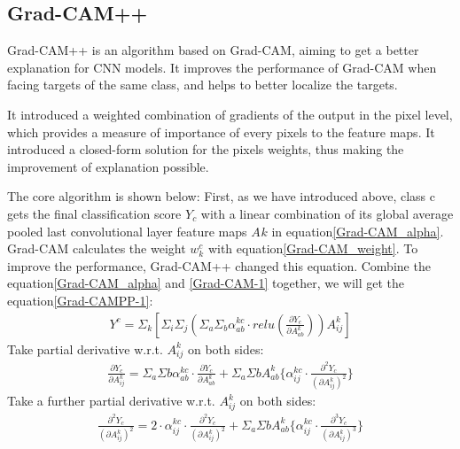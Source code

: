 \documentclass[conference]{IEEEtran}
\begin{document}
	\subsection{Grad-CAM++}
	Grad-CAM++ is an algorithm based on Grad-CAM, aiming to get a better explanation for CNN models. It improves the performance of Grad-CAM when facing targets of the same class, and helps to better localize the targets.\par
	It introduced a weighted combination of gradients of the output in the pixel level, which provides a measure of importance of every pixels to the feature maps.
	It introduced a closed-form solution for the pixels weights, thus making the improvement of explanation possible. \par
	The core algorithm is shown below:
	First, as we have introduced above, class c gets the final classification score $Y_{c}$ with a linear combination of its global average pooled last convolutional layer feature maps $A_{}k$ in equation\ref{Grad-CAM_alpha}.
	Grad-CAM calculates the weight $w_{k}^{c}$ with equation\ref{Grad-CAM_weight}.  To improve the performance, Grad-CAM++ changed this equation.
	Combine the equation\ref{Grad-CAM_alpha} and \ref{Grad-CAM-1} together, we will get the equation\ref{Grad-CAMPP-1}:
	\begin{equation}
		\begin{aligned}
			Y^{c}=\Sigma_{k}[\Sigma_{i}\Sigma_{j}(\Sigma_{a}\Sigma_{b}\alpha_{ab}^{kc}·relu(\frac{\partial Y_{c}}{\partial A_{ab}^{k}}))A_{ij}^{k}]
			\label{Grad-CAMPP-1}
		\end{aligned}
	\end{equation}
	Take partial derivative w.r.t. $A_{ij}^{k}$ on both sides:
	\begin{equation}
		\begin{aligned}
			\frac{\partial Y_{c}}{\partial A_{ij}^{k}}=\Sigma_{a}\Sigma{b}\alpha_{ab}^{kc}·\frac{\partial Y_{c}}{\partial A_{ab}^{k}}+\Sigma_{a}\Sigma{b}A_{ab}^{k}\{\alpha_{ij}^{kc}·\frac{\partial^{2} Y_{c}}{(\partial A_{ij}^{k} )^{2}}\}
			\label{Grad-CAMPP-2}
		\end{aligned}
	\end{equation}
	Take a further partial derivative w.r.t. $A_{ij}^{k}$ on both sides:
	\begin{equation}
		\begin{aligned}
			\frac{\partial^{2} Y_{c}}{(\partial A_{ij}^{k})^{2}}=2·\alpha_{ij}^{kc}·\frac{\partial^{2} Y_{c}}{(\partial A_{ij}^{k})^{2}}+\Sigma_{a}\Sigma{b}A_{ab}^{k}\{\alpha_{ij}^{kc}·\frac{\partial^{3} Y_{c}}{(\partial A_{ij}^{k})^{3}}\}
			\label{Grad-CAMPP-3}
		\end{aligned}
	\end{equation}
\end{document}
